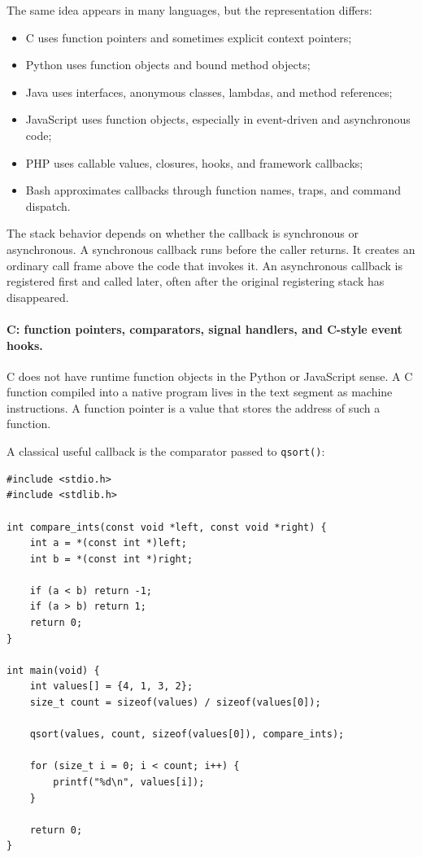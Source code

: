 The same idea appears in many languages, but the representation differs:

\begin{itemize}
    \item C uses function pointers and sometimes explicit context pointers;
    \item Python uses function objects and bound method objects;
    \item Java uses interfaces, anonymous classes, lambdas, and method references;
    \item JavaScript uses function objects, especially in event-driven and asynchronous code;
    \item PHP uses callable values, closures, hooks, and framework callbacks;
    \item Bash approximates callbacks through function names, traps, and command dispatch.
\end{itemize}

The stack behavior depends on whether the callback is synchronous or asynchronous. A synchronous callback runs before the caller returns. It creates an ordinary call frame above the code that invokes it. An asynchronous callback is registered first and called later, often after the original registering stack has disappeared.

\paragraph{C: function pointers, comparators, signal handlers, and C-style event hooks.}

C does not have runtime function objects in the Python or JavaScript sense. A C function compiled into a native program lives in the text segment as machine instructions. A function pointer is a value that stores the address of such a function.

A classical useful callback is the comparator passed to \texttt{qsort()}:

\begin{verbatim}
#include <stdio.h>
#include <stdlib.h>

int compare_ints(const void *left, const void *right) {
    int a = *(const int *)left;
    int b = *(const int *)right;

    if (a < b) return -1;
    if (a > b) return 1;
    return 0;
}

int main(void) {
    int values[] = {4, 1, 3, 2};
    size_t count = sizeof(values) / sizeof(values[0]);

    qsort(values, count, sizeof(values[0]), compare_ints);

    for (size_t i = 0; i < count; i++) {
        printf("%d\n", values[i]);
    }

    return 0;
}
\end{verbatim}

